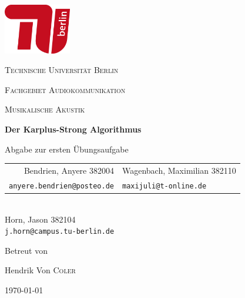 \begin{titlepage}
    \centering
    \includegraphics[height=62pt]{tu_red.png}\par
    {\scshape\huge Technische Universität Berlin \par}
    {\scshape\Large Fachgebiet Audiokommunikation\par}
    \vspace{1.5cm}
    {\scshape\LARGE Musikalische Akustik\par}
    \vspace{1.5cm}

    {\Huge\bfseries {Der Karplus-Strong Algorithmus}\par}
    \vspace{0.1cm}
    {\large Abgabe zur ersten Übungsaufgabe\par}
    \vspace{1cm}

    {\itshape
        \begin{tabular}{rl}
          Bendrien, Anyere 382004 &
          Wagenbach, Maximilian 382110 \\
          \vspace{0.2cm}
          \small \texttt{anyere.bendrien@posteo.de} &
          \small \texttt{maxijuli@t-online.de}
        \end{tabular}\\
        Horn, Jason 382104 \\
        \small \texttt{j.horn@campus.tu-berlin.de} 
    }
    \vfill
    
    Betreut von\par
    Hendrik Von \textsc{Coler}
    \vspace{1cm}
    
    {\large \today\par}
\end{titlepage}